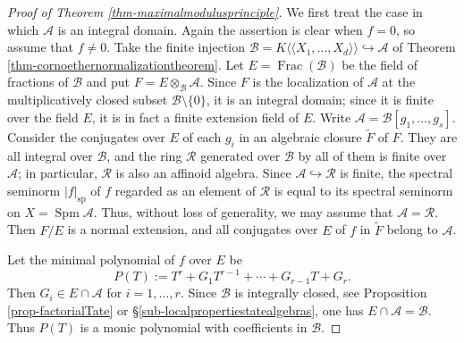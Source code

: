\documentclass[a4paper,12pt, dvipdfmx]{jsbook}
\def\til#1{\widetilde{#1}}%
\def\sp{\mathop{\mathrm{sp}}\nolimits}
\def\Spm{\mathop{\mathrm{Spm}}\nolimits}
\def\Frac{\mathop{\mathrm{Frac}}\nolimits}
\def\dl{\langle\!\langle}
\def\dr{\rangle\!\rangle}
\newcommand{\abs}[1]{\lvert#1\rvert}
\theoremstyle{plain}
\theoremstyle{definition}
\begin{document}
\begin{proof}[Proof of Theorem {\rm \ref{thm-maximalmodulusprinciple}}]
We first treat the case in which $\mathcal{A}$ is an integral domain.
Again the assertion is clear when $f=0$, so assume that $f\neq 0$.
Take the finite injection $\mathcal{B}=K\dl X_1,\ldots,X_d\dr\hookrightarrow\mathcal{A}$ of Theorem \ref{thm-cornoethernormalizationtheorem}.
Let $E=\Frac(\mathcal{B})$ be the field of fractions of $\mathcal{B}$ and put $F=E\otimes_{\mathcal{B}}\mathcal{A}$. Since $F$ is the localization of $\mathcal{A}$ at the multiplicatively closed subset $\mathcal{B}\setminus\{0\}$, it is an integral domain; since it is finite over the field $E$, it is in fact a finite extension field of $E$.
Write $\mathcal{A}=\mathcal{B}[g_1,\ldots,g_s]$. Consider the conjugates over $E$ of each $g_i$ in an algebraic closure $\til{F}$ of $F$. They are all integral over $\mathcal{B}$, and the ring $\mathcal{R}$ generated over $\mathcal{B}$ by all of them is finite over $\mathcal{A}$; in particular, $\mathcal{R}$ is also an affinoid algebra.
Since $\mathcal{A}\hookrightarrow\mathcal{R}$ is finite, the spectral seminorm $\abs{f}_{\sp}$ of $f$ regarded as an element of $\mathcal{R}$ is equal to its spectral seminorm on $X=\Spm\mathcal{A}$.
Thus, without loss of generality, we may assume that $\mathcal{A}=\mathcal{R}$.
Then $F/E$ is a normal extension, and all conjugates over $E$ of $f$ in $\til{F}$ belong to $\mathcal{A}$.

Let the minimal polynomial of $f$ over $E$ be
$$
P(T):=T^r+G_1T^{r-1}+\cdots+G_{r-1}T+G_r.
$$
Then $G_i\in E\cap\mathcal{A}$ for $i=1,\ldots,r$. Since $\mathcal{B}$ is integrally closed, see Proposition \ref{prop-factorialTate} or \S\ref{sub-localpropertiestatealgebras}, one has $E\cap\mathcal{A}=\mathcal{B}$. Thus $P(T)$ is a monic polynomial with coefficients in $\mathcal{B}$.


\end{proof}
\end{document}
